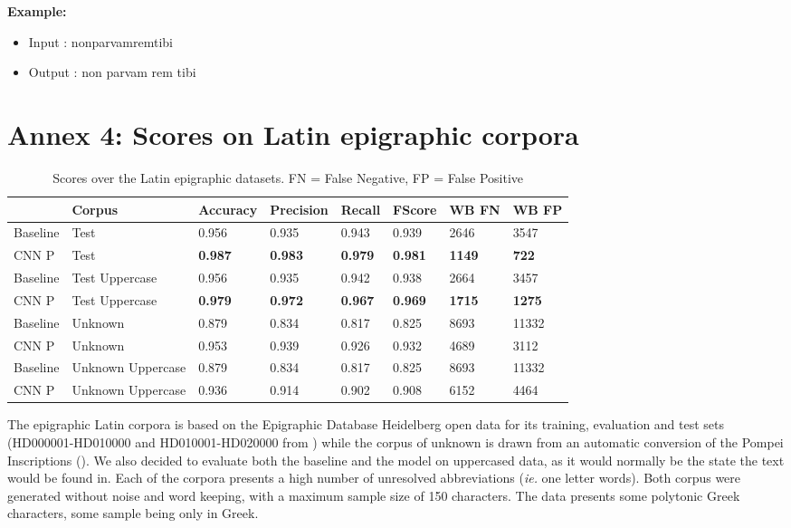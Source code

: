 \documentclass{jdmdh}
\begin{document}
\textbf{Example:}

\begin{itemize}
    \item Input : nonparvamremtibi
    \item Output : non parvam rem tibi

\end{itemize}

\section{Annex 4: Scores on Latin epigraphic corpora}

\begin{table}[H]
\centering
\begin{tabular}{llllllll}
\hline
 & Corpus & Accuracy & Precision & Recall & FScore & WB FN & WB FP \\ \hline
Baseline & Test & 0.956 & 0.935 & 0.943 & 0.939 & 2646 & 3547 \\
CNN P & Test & \textbf{0.987} & \textbf{0.983} & \textbf{0.979} & \textbf{0.981} & \textbf{1149} & \textbf{722} \\ \hline
Baseline & Test Uppercase & 0.956 & 0.935 & 0.942 & 0.938 & 2664 & 3457 \\
CNN P & Test Uppercase & \textbf{0.979} & \textbf{0.972} & \textbf{0.967} & \textbf{0.969} & \textbf{1715} & \textbf{1275} \\ \hline
Baseline & Unknown & 0.879 & 0.834 & 0.817 & 0.825 & 8693 & 11332 \\
CNN P & Unknown & 0.953 & 0.939 & 0.926 & 0.932 & 4689 & 3112 \\ \hline
Baseline & Unknown Uppercase & 0.879 & 0.834 & 0.817 & 0.825 & 8693 & 11332 \\
CNN P & Unknown Uppercase & 0.936 & 0.914 & 0.902 & 0.908 & 6152 & 4464 \\ \hline
\end{tabular}
\caption{Scores over the Latin epigraphic datasets. FN = False Negative, FP = False Positive}
\label{tab:epigraphyc_latin}
\end{table}


The epigraphic Latin corpora is based on the Epigraphic Database Heidelberg open data \citet{formulae} for its training, evaluation and test sets (HD000001-HD010000 and HD010001-HD020000 from \citet{edh}) while the corpus of unknown is drawn from an automatic conversion of the Pompei Inscriptions (\citet{pompei}). We also decided to evaluate both the baseline and the model on uppercased data, as it would normally be the state the text would be found in. Each of the corpora presents a high number of unresolved abbreviations (\textit{ie.} one letter words). Both corpus were generated without noise and word keeping, with a maximum sample size of 150 characters. The data presents some polytonic Greek characters, some sample being only in Greek.
\end{document}
